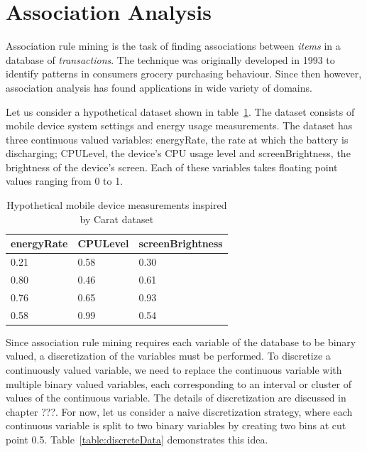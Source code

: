 \section{Association Analysis} \label{association analysis}

Association rule mining is the task of finding associations between \textit{items} in a database of \textit{transactions}. The technique was originally developed in 1993 to identify patterns in consumers grocery purchasing behaviour. Since then however, association analysis has found applications in wide variety of domains.

Let us consider a hypothetical dataset shown in table~\ref{table:raw-data}. The dataset consists of mobile device system settings and energy usage measurements. The dataset has three continuous valued variables:  energyRate, the rate at which the battery is discharging;  CPULevel, the device's CPU usage level and screenBrightness, the brightness of the device's screen. Each of these variables takes floating point values ranging from 0 to 1.
\begin{table}[htb]
    \begin{tabular}{ | l | l | l | }
    \hline
    \textbf{energyRate} & \textbf{CPULevel} & \textbf{screenBrightness} \\ \hline
    0.21 & 0.58 & 0.30 \\ \hline 
    0.80 & 0.46 & 0.61 \\ \hline 
    0.76 & 0.65 & 0.93 \\ \hline 
    0.58 & 0.99 & 0.54 \\ \hline 
    \end{tabular}
	\caption{Hypothetical mobile device measurements inspired by Carat dataset}
	\label{table:raw-data}
\end{table}

Since association rule mining requires each variable of the database to be binary valued, a discretization of the variables must be performed. To discretize a continuously valued variable, we need to replace the continuous variable with multiple binary valued variables, each corresponding to an interval or cluster of values of the continuous variable. The details of discretization are discussed in chapter ???. For now, let us consider a naive discretization strategy, where each continuous variable is split to two binary variables by creating two bins at cut point 0.5. Table~\ref{table:discreteData} demonstrates this idea.

